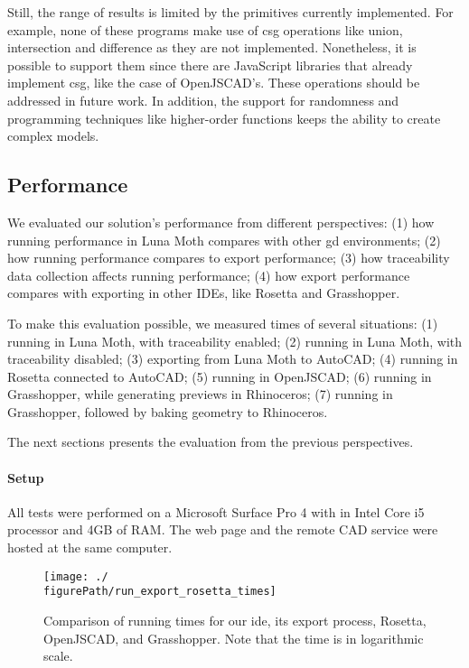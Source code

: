 Still, the range of results is limited by the primitives currently implemented.
For example, none of these programs make use of \gls{csg} operations like union, intersection and difference as they are not implemented.
Nonetheless, it is possible to support them since there are JavaScript libraries that already implement \gls{csg}, like the case of OpenJSCAD's.
These operations should be addressed in future work.
In addition, the support for randomness and programming techniques like higher-order functions keeps the ability to create complex models.


\subsection{Performance}
We evaluated our solution's performance from different perspectives:
(1) how running performance in Luna Moth compares with other \gls{gd} environments;
(2) how running performance compares to export performance;
(3) how traceability data collection affects running performance;
(4) how export performance compares with exporting in other IDEs, like Rosetta and Grasshopper.

To make this evaluation possible, we measured times of several situations:
(1) running in Luna Moth, with traceability enabled;
(2) running in Luna Moth, with traceability disabled;
(3) exporting from Luna Moth to AutoCAD;
(4) running in Rosetta connected to AutoCAD;
(5) running in OpenJSCAD;
(6) running in Grasshopper, while generating previews in Rhinoceros;
(7) running in Grasshopper, followed by baking geometry to Rhinoceros.

The next sections presents the evaluation from the previous perspectives.

\paragraph{Setup}
All tests were performed on a Microsoft Surface Pro 4 with in Intel Core i5 processor and 4GB of RAM.
The web page and the remote CAD service were hosted at the same computer.

\begin{figure}
  \centering
  \texttt{[image: ./\\figurePath/run\_export\_rosetta\_times]}
  \caption[Comparison of running times for our \gls{ide}, its export process, Rosetta, OpenJSCAD, and Grasshopper.]{Comparison of running times for our \gls{ide}, its export process, Rosetta, OpenJSCAD, and Grasshopper. Note that the time is in logarithmic scale.}
  \label{fig:run:export:rosetta:chart}
\end{figure}


